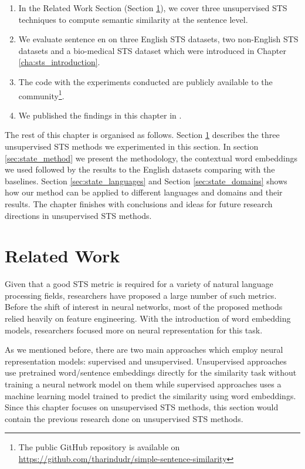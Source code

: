 \begin{enumerate}
	\item In the Related Work Section (Section \ref{sec:state_related}), we cover three unsupervised STS techniques to compute semantic similarity at the sentence level. 
	
	\item We evaluate sentence en on three English STS datasets, two non-English STS datasets and a bio-medical STS dataset which were introduced in Chapter \ref{cha:sts_introduction}.
	
	\item The code with the experiments conducted are publicly available to the community\footnote{The public GitHub repository is available on \url{https://github.com/tharindudr/simple-sentence-similarity}}.
	
	\item We published the findings in this chapter in \citet{ranasinghe-etal-2019-enhancing}.
	
\end{enumerate}

The rest of this chapter is organised as follows. Section \ref{sec:state_related} describes the three unsupervised STS methods we experimented in this section. In section \ref{sec:state_method} we present the methodology, the contextual word embeddings we used followed by the results to the English datasets comparing with the baselines. Section \ref{sec:state_languages} and Section \ref{sec:state_domains} shows how our method can be applied to different languages and domains and their results. The chapter finishes with conclusions and ideas for future research directions in unsupervised STS methods.


\section{Related Work}
\label{sec:state_related}
Given that a good STS metric is required for a variety of natural language processing fields, researchers have proposed a large number of such metrics. Before the shift of interest in neural networks, most of the proposed methods relied heavily on feature engineering. With the introduction of word embedding models, researchers focused more on neural representation for this task. 

As we mentioned before, there are two main approaches which employ neural representation models: supervised and unsupervised. Unsupervised approaches use pretrained word/sentence embeddings directly for the similarity task without training a neural network model on them while supervised approaches uses a machine learning model trained to predict the similarity using word embeddings. Since this chapter focuses on unsupervised STS methods, this section would contain the previous research done on unsupervised STS methods.



